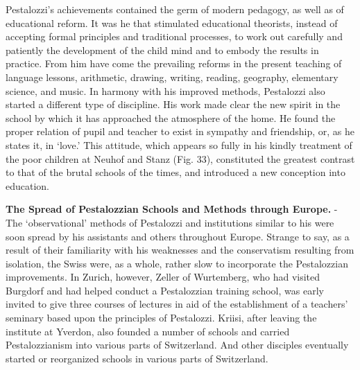 \documentclass[
]{book}
\begin{document}
Pestalozzi's achievements contained the germ of modern pedagogy, as well as of educational reform. It was he that stimulated educational theorists, instead of accepting formal principles and traditional processes, to work out carefully and patiently the development of the child mind and to embody the results in practice. From him have come the prevailing reforms in the present teaching of language lessons, arithmetic, drawing, writing, reading, geography, elementary science, and music. In harmony with his improved methods, Pestalozzi also started a different type of discipline. His work made clear the new spirit in the school by which it has approached the atmosphere of the home. He found the proper relation of pupil and teacher to exist in sympathy and friendship, or, as he states it, in `love.' This attitude, which appears so fully in his kindly treatment of the poor children at Neuhof and Stanz (Fig. 33), constituted the greatest contrast to that of the brutal schools of the times, and introduced a new conception into education.

\textbf{The Spread of Pestalozzian Schools and Methods through Europe.} - The `observational' methods of Pestalozzi and institutions similar to his were soon spread by his assistants and others throughout Europe. Strange to say, as a result of their familiarity with his weaknesses and the conservatism resulting from isolation, the Swiss were, as a whole, rather slow to incorporate the Pestalozzian improvements. In Zurich, however, Zeller of Wurtemberg, who had visited Burgdorf and had helped conduct a Pestalozzian training school, was early invited to give three courses of lectures in aid of the establishment of a teachers' seminary based upon the principles of Pestalozzi. Kriisi, after leaving the institute at Yverdon, also founded a number of schools and carried Pestalozzianism into various parts of Switzerland. And other disciples eventually started or reorganized schools in various parts of Switzerland.
\end{document}
